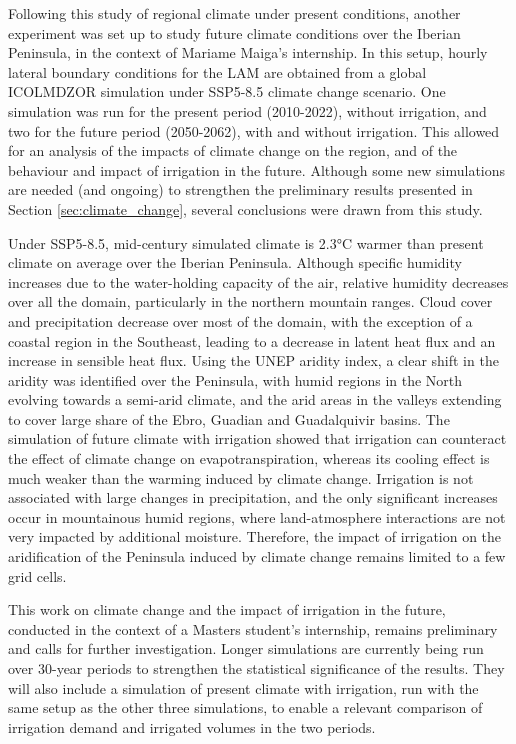 \hfill

Following this study of regional climate under present conditions, another experiment was set up to study future climate conditions over the Iberian Peninsula, in the context of Mariame Maiga's internship.
In this setup, hourly lateral boundary conditions for the LAM are obtained from a global ICOLMDZOR simulation under SSP5-8.5 climate change scenario. 
One simulation was run for the present period (2010-2022), without irrigation, and two for the future period (2050-2062), with and without irrigation. This allowed for an analysis of the impacts of climate change on the region, and of the behaviour and impact of irrigation in the future. 
Although some new simulations are needed (and ongoing) to strengthen the preliminary results presented in Section \ref{sec:climate_change}, several conclusions were drawn from this study. 

Under SSP5-8.5, mid-century simulated climate is 2.3°C warmer than present climate on average over the Iberian Peninsula. Although specific humidity increases due to the water-holding capacity of the air, relative humidity decreases over all the domain, particularly in the northern mountain ranges. Cloud cover and precipitation decrease over most of the domain, with the exception of a coastal region in the Southeast, leading to a decrease in latent heat flux and an increase in sensible heat flux. Using the UNEP aridity index, a clear shift in the aridity was identified over the Peninsula, with humid regions in the North evolving towards a semi-arid climate, and the arid areas in the valleys extending to cover large share of the Ebro, Guadian and Guadalquivir basins.
The simulation of future climate with irrigation showed that irrigation can counteract the effect of climate change on evapotranspiration, whereas its cooling effect is much weaker than the warming induced by climate change. Irrigation is not associated with large changes in precipitation, and the only significant increases occur in mountainous humid regions, where land-atmosphere interactions are not very impacted by additional moisture. 
Therefore, the impact of irrigation on the aridification of the Peninsula induced by climate change remains limited to a few grid cells.

This work on climate change and the impact of irrigation in the future, conducted in the context of a Masters student's internship, remains preliminary and calls for further investigation. Longer simulations are currently being run over 30-year periods to strengthen the statistical significance of the results. They will also include a simulation of present climate with irrigation, run with the same setup as the other three simulations, to enable a relevant comparison of irrigation demand and irrigated volumes in the two periods.

\clearpage
